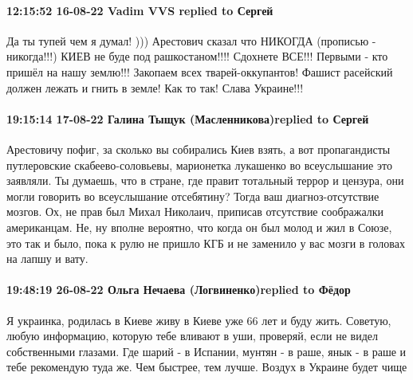  
 
 
 
 

\paragraph{12:15:52 16-08-22 Vadim VVS replied to Сергей}

Да ты тупей чем я думал! ))) Арестович сказал что НИКОГДА (прописью -
никогда!!!) КИЕВ не буде под рашкостаном!!!! Сдохнете ВСЕ!!! Первыми - кто
пришёл на нашу землю!!! Закопаем всех тварей-оккупантов! Фашист расейский
должен лежать и гнить в земле! Как то так! Слава Украине!!!

\paragraph{19:15:14 17-08-22 Галина Тыщук (Масленникова)replied to Сергей}

Арестовичу пофиг, за сколько вы собирались Киев взять, а вот пропагандисты
путлеровские скабеево-соловьевы, марионетка лукашенко во всеуслышание это
заявляли. Ты думаешь, что в стране, где правит тотальный террор и цензура, они
могли говорить во всеуслышание отсебятину? Тогда ваш диагноз-отсутствие мозгов.
Ох, не прав был Михал Николаич, приписав отсутствие соображалки американцам.
Не, ну вполне вероятно, что когда он был молод и жил в Союзе, это так и было,
пока к рулю не пришло КГБ и не заменило у вас мозги в головах на лапшу и вату.

\paragraph{19:48:19 26-08-22 Ольга Нечаева (Логвиненко)replied to Фёдор}

Я украинка, родилась в Киеве живу в Киеве уже 66 лет и буду жить. Советую,
любую информацию, которую тебе вливают в уши, проверяй, если не видел
собственными глазами. Где шарий - в Испании, мунтян - в раше, янык - в раше и
тебе рекомендую туда же. Чем быстрее, тем лучше. Воздух в Украине будет чище
